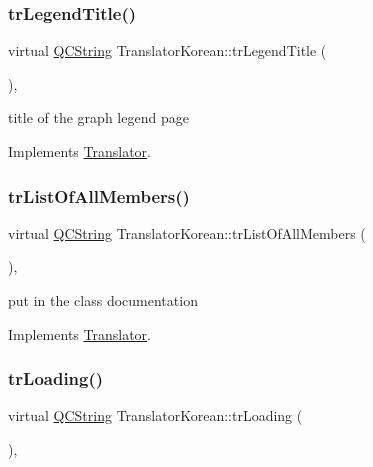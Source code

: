 \subsubsection{\texorpdfstring{trLegendTitle()}{trLegendTitle()}}
{\footnotesize\ttfamily virtual \mbox{\hyperlink{class_q_c_string}{Q\+C\+String}} Translator\+Korean\+::tr\+Legend\+Title (\begin{DoxyParamCaption}{ }\end{DoxyParamCaption})\hspace{0.3cm}{\ttfamily [inline]}, {\ttfamily [virtual]}}

title of the graph legend page 

Implements \mbox{\hyperlink{class_translator}{Translator}}.

\mbox{\label{class_translator_korean_af00d2e0f5692c1f18a1c210152945e28}} 
\subsubsection{\texorpdfstring{trListOfAllMembers()}{trListOfAllMembers()}}
{\footnotesize\ttfamily virtual \mbox{\hyperlink{class_q_c_string}{Q\+C\+String}} Translator\+Korean\+::tr\+List\+Of\+All\+Members (\begin{DoxyParamCaption}{ }\end{DoxyParamCaption})\hspace{0.3cm}{\ttfamily [inline]}, {\ttfamily [virtual]}}

put in the class documentation 

Implements \mbox{\hyperlink{class_translator}{Translator}}.

\mbox{\label{class_translator_korean_a16e71cfc77963d54b0b3c94c66e7a786}} 
\subsubsection{\texorpdfstring{trLoading()}{trLoading()}}
{\footnotesize\ttfamily virtual \mbox{\hyperlink{class_q_c_string}{Q\+C\+String}} Translator\+Korean\+::tr\+Loading (\begin{DoxyParamCaption}{ }\end{DoxyParamCaption})\hspace{0.3cm}{\ttfamily [inline]}, {\ttfamily [virtual]}}

